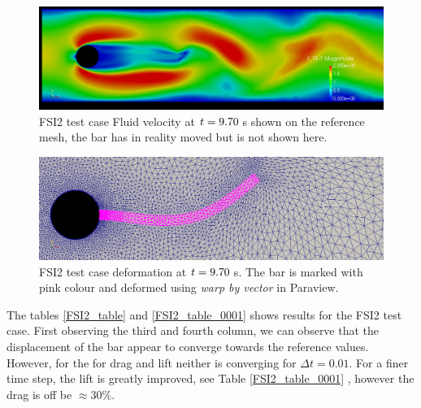 \begin{figure}[H]
\includegraphics[scale=0.35,trim={0mm 0mm 0mm 0mm},clip]{./Verification_Validation/Hron_Turek/FSI2_u_970.png}
\caption{FSI2 test case Fluid velocity at $ t = 9.70 \hspace{1mm} $s shown on the reference mesh, the bar has in reality moved but is not shown here.}
\end{figure}

\begin{figure}[H]
\includegraphics[scale=0.35,trim={0mm 0mm 0mm 0mm},clip]{./Verification_Validation/Hron_Turek/FSI2_d_970.png}
\caption{FSI2 test case deformation at $t =9.70 \hspace{1mm}$s. The bar is marked with pink colour and deformed using \textit{warp by vector} in Paraview.}
\end{figure}

The tables \ref{FSI2_table} and \ref{FSI2_table_0001} shows results for the FSI2 test case. First observing the third and fourth column, we can observe that the displacement of the bar appear to converge towards the reference values. However, for the for drag and lift neither is converging for $\Delta t = 0.01$. For a finer time step, the lift is greatly improved, see Table \ref{FSI2_table_0001} , however the drag is off be $\approx 30 \%$.

